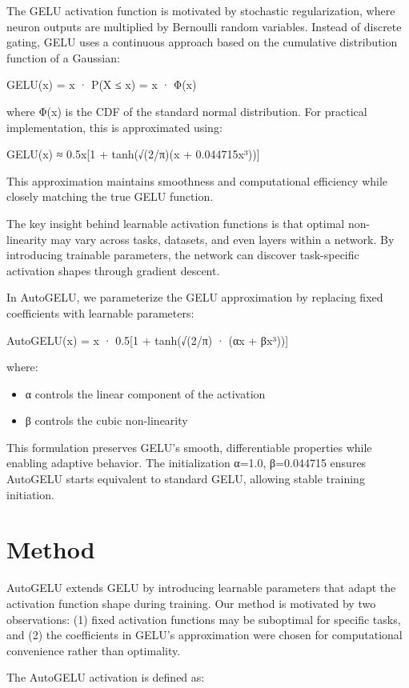 \documentclass[10pt]{article}
\begin{document}
The GELU activation function is motivated by stochastic regularization, where neuron outputs are multiplied by Bernoulli random variables. Instead of discrete gating, GELU uses a continuous approach based on the cumulative distribution function of a Gaussian:

GELU(x) = x · P(X ≤ x) = x · Φ(x)

where Φ(x) is the CDF of the standard normal distribution. For practical implementation, this is approximated using:

GELU(x) ≈ 0.5x[1 + tanh(√(2/π)(x + 0.044715x³))]

This approximation maintains smoothness and computational efficiency while closely matching the true GELU function.

The key insight behind learnable activation functions is that optimal non-linearity may vary across tasks, datasets, and even layers within a network. By introducing trainable parameters, the network can discover task-specific activation shapes through gradient descent.

In AutoGELU, we parameterize the GELU approximation by replacing fixed coefficients with learnable parameters:

AutoGELU(x) = x · 0.5[1 + tanh(√(2/π) · (αx + βx³))]

where:
\begin{itemize}
\item α controls the linear component of the activation
\item β controls the cubic non-linearity
\end{itemize}

This formulation preserves GELU's smooth, differentiable properties while enabling adaptive behavior. The initialization α=1.0, β=0.044715 ensures AutoGELU starts equivalent to standard GELU, allowing stable training initiation.

\section{Method}

AutoGELU extends GELU by introducing learnable parameters that adapt the activation function shape during training. Our method is motivated by two observations: (1) fixed activation functions may be suboptimal for specific tasks, and (2) the coefficients in GELU's approximation were chosen for computational convenience rather than optimality.

The AutoGELU activation is defined as:
\end{document}
